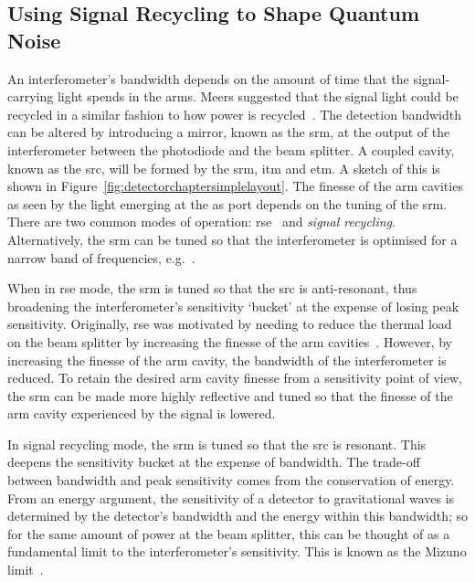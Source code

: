 \subsection{Using Signal Recycling to Shape Quantum Noise}
\label{sec:detector_chapter_signal_recycling}
An interferometer's bandwidth depends on the amount of time that the signal-carrying light spends in the arms. Meers suggested that the signal light could be recycled in a similar fashion to how power is recycled~\cite{Meers1988}. The detection bandwidth can be altered by introducing a mirror, known as the \gls{srm}, at the output of the interferometer between the photodiode and the beam splitter. A coupled cavity, known as the \gls{src}, will be formed by the \gls{srm}, \gls{itm} and \gls{etm}. A sketch of this is shown in Figure~\ref{fig:detectorchaptersimplelayout}. The finesse of the arm cavities as seen by the light emerging at the \gls{as} port depends on the tuning of the \gls{srm}. There are two common modes of operation: \gls{rse}~\cite{Heinzel1996,Mizuno1993} and \emph{signal recycling}. Alternatively, the \gls{srm} can be tuned so that the interferometer is optimised for a narrow band of frequencies, e.g.~\cite{Ganapathy2020}. 
\par
When in \gls{rse} mode, the \gls{srm} is tuned so that the \gls{src} is anti-resonant, thus broadening the interferometer's sensitivity `bucket' at the expense of losing peak sensitivity. Originally, \gls{rse} was motivated by needing to reduce the thermal load on the beam splitter by increasing the finesse of the arm cavities~\cite{Mizuno1993}. However, by increasing the finesse of the arm cavity, the bandwidth of the interferometer is reduced. To retain the desired arm cavity finesse from a sensitivity point of view, the \gls{srm} can be made more highly reflective and tuned so that the finesse of the arm cavity experienced by the signal is lowered.
\par
In signal recycling mode, the \gls{srm} is tuned so that the \gls{src} is resonant. This deepens the sensitivity bucket at the expense of bandwidth. The trade-off between bandwidth and peak sensitivity comes from the conservation of energy. From an energy argument, the sensitivity of a detector to gravitational waves is determined by the detector's bandwidth and the energy within this bandwidth; so for the same amount of power at the beam splitter, this can be thought of as a fundamental limit to the interferometer's sensitivity. This is known as the Mizuno limit~\cite{Mizuno1995}.
